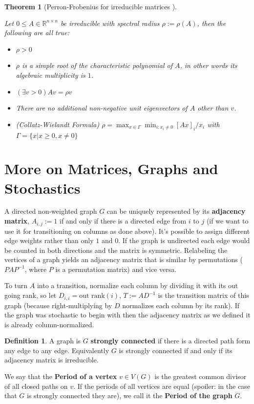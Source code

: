 \documentclass[a4paper,10pt]{article}
\newcommand{\R}{\mathbb{R}}
\newcommand{\gt}{>}
\theoremstyle{definition}
\newtheorem{mydef}{Definition}[section]
\theoremstyle{remark}
\theoremstyle{plain}
\newtheorem{thm}{Theorem}[section]
\begin{document}
\begin{thm}[Perron-Frobenius for irreducible matrices \autocite{meyer2000matrix}]
\label{thm:perron2}

Let $0 \leq A \in \R^{n \times n}$ be irreducible with spectral radius $\rho := \rho(A)$,
then the following are all true:
\begin{itemize}
\item{} $\rho \gt 0$
\item{} $\rho$ is a simple root of the characteristic polynomial of $A$,
in other words its algebraic multiplicity is $1$.
\item{} $(\exists v > 0) Av=\rho v$
\item{} There are no additional non-negative unit eigenvectors of $A$ other than
$v$. 
\item{(Collatz-Wielandt Formula)} $\rho = \max_{x \in \Gamma} \min_{i : x_i \neq 0} [Ax]_i / x_i$
with $\Gamma = \{x | x \geq 0, x \neq 0\}$
\end{itemize}
\end{thm}


\section{More on Matrices, Graphs and Stochastics}

A directed non-weighted graph $G$ can be uniquely represented by its
\textbf{adjacency matrix},
$A_{i,j} := 1$ if and only if there is a directed edge from $i$ to $j$ (if we
want to use it for transitioning on columns as done above). It's possible to
assign different edge weights rather than only $1$ and $0$. If the graph is
undirected each edge would be counted in both directions and the matrix is
symmetric.
Relabeling the vertices of a graph yields an adjacency matrix that is similar by
permutations ($PAP^{-1}$, where $P$ is a permutation matrix) and vice versa.

To turn $A$ into a transition, normalize each column by dividing it with
its out going rank, so let $D_{i,i} = \text{out~rank}(i)$, $T:=AD^{-1}$ is the
transition matrix of this graph (because right-multiplying by $D$ normalizes each
column by its rank).
If the graph was stochastic to begin with then the adjacency matrix as we
defined it is already column-normalized.

\begin{mydef}
\label{def:stronglyconnected}
A graph is $G$ \textbf{strongly connected} if there is a directed path form any edge
to any edge. Equivalently $G$ is strongly connected if and only if its adjacency matrix is irreducible.

We say that the \textbf{Period of a vertex} $v \in V(G)$ is the greatest common
divisor of all closed paths on $v$. If the periods of all vertices are equal
(spoiler: in the case that $G$ is strongly connected they are), we call it the
\textbf{Period of the graph} $G$.
\end{mydef}
\end{document}
